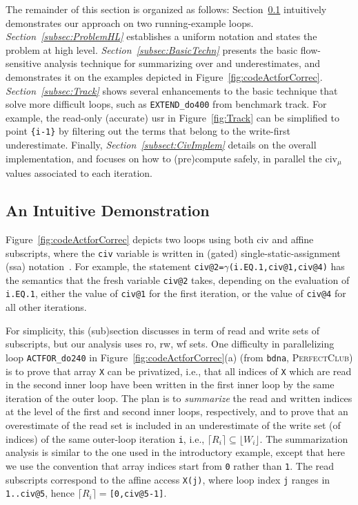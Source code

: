 \documentclass{sig-alternate}
\begin{document}
The remainder of this section is organized as follows:
Section~\ref{Intro:RelAppLim} intuitively demonstrates our approach 
on two running-example loops. %
%
{\em Section~\ref{subsec:ProblemHL}} establishes a uniform notation and
states the problem at high level.
%
{\em Section~\ref{subsec:BasicTechn}} presents the basic flow-sensitive 
analysis technique for summarizing over and underestimates, and 
demonstrates it on the examples depicted in 
Figure~\ref{fig:codeActforCorrec}.
%
{\em Section~\ref{subsec:Track}} shows several enhancements
to the basic technique that solve %
more difficult loops, such as {\tt EXTEND\_do400} from benchmark {\sc track}.
%
For example, the read-only (accurate) {\sc usr} in Figure~\ref{fig:Track}
can be simplified to point {\tt \{i-1\}} by filtering out the terms
that belong to the write-first underestimate.
%
Finally, {\em Section~\ref{subsect:CivImplem}} details on the overall 
implementation, and focuses on how to (pre)compute safely, in parallel 
the {\sc civ}$_\mu$ values associated to each iteration.


\subsection{An Intuitive Demonstration}
\label{Intro:RelAppLim}

Figure~\ref{fig:codeActforCorrec} depicts two loops
using both {\sc civ} and affine subscripts, where the {\tt civ} variable 
is written in (gated) single-static-assignment ({\sc ssa}) notation~\cite{GatedSSA}.
%
For example, the statement {\tt civ@2=$\gamma$(i.EQ.1,civ@1,civ@4)}
has the semantics that the fresh variable {\tt civ@2} takes, depending 
on the evaluation of {\tt i.EQ.1}, either the value 
of {\tt civ@1} for the first iteration, or the value of 
{\tt civ@4} for all other iterations.

For simplicity, this (sub)section discusses in term of read and write sets 
of subscripts, but our analysis uses {\sc ro}, {\sc rw}, {\sc wf} sets.
%
One difficulty in parallelizing loop {\tt ACTFOR\_do240}
in Figure~\ref{fig:codeActforCorrec}(a) (from {\tt bdna}, \textsc{PerfectClub})
is to prove that array {\tt X} can be privatized, i.e., that all
indices of {\tt X} which are read in the second inner loop have been 
written in the first inner loop by the same iteration of the outer loop.
The plan is to {\em summarize} the read and written indices at the level of
the first and second inner loops, respectively, and to prove that an
overestimate of the read set  is included in an underestimate 
of the write set (of indices) of the same outer-loop iteration {\tt i},
i.e., $\lceil R_i\rceil \subseteq \lfloor W_i\rfloor$.
%
The summarization analysis is similar to the one used in the introductory 
example, except that here we use the convention %
that array indices start from {\tt 0} rather than {\tt 1}.
The read subscripts correspond to the affine access {\tt X(j)}, where
loop index {\tt j} ranges in {\tt 1..civ@5},
hence $\lceil{}R_i\rceil=${\tt[0,civ@5-1]}.
\end{document}
